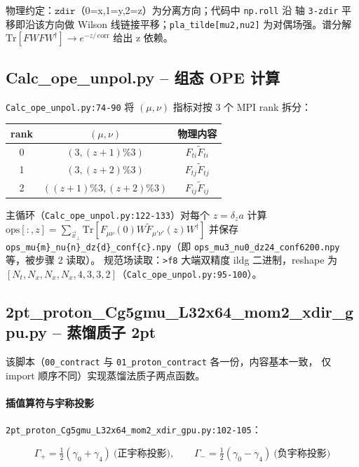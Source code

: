 \documentclass[UTF8]{ctexart}
\begin{document}
物理约定：$\texttt{zdir}$（0=x,1=y,2=z）为分离方向；代码中 \texttt{np.roll} 沿
轴 \texttt{3-zdir} 平移即沿该方向做 Wilson 线链接平移；\texttt{pla\_tilde[mu2,nu2]}
为对偶场强。谱分解 $\mathrm{Tr}[FWFW^\dagger]\to e^{-z/\,\text{corr}}$ 给出 z 依赖。

\subsection{Calc\_ope\_unpol.py -- 组态 OPE 计算}

\texttt{Calc\_ope\_unpol.py:74-90} 将 $(\mu,\nu)$ 指标对按 3 个 MPI rank 拆分：

\begin{center}
\begin{tabular}{ccc}
\toprule
rank & $(\mu,\nu)$ & 物理内容 \\
\midrule
0 & $(3,(z+1)\%3)$ & $F_{t i} \tilde F_{t i}$ \\
1 & $(3,(z+2)\%3)$ & $F_{t j} \tilde F_{t j}$ \\
2 & $((z+1)\%3,(z+2)\%3)$ & $F_{i j} \tilde F_{i j}$ \\
\bottomrule
\end{tabular}
\end{center}

主循环（\texttt{Calc\_ope\_unpol.py:122-133}）对每个 $z=\delta_z a$ 计算
$\mathrm{ops}[:,z]=\sum_{\vec x_\perp}\mathrm{Tr}[F_{\mu\nu}(0)W\tilde F_{\mu'\nu'}(z)W^\dagger]$
并保存 \texttt{ops\_mu\{m\}\_nu\{n\}\_dz\{d\}\_conf\{c\}.npy}（即
\texttt{ops\_mu3\_nu0\_dz24\_conf6200.npy} 等，被步骤 2 读取）。
规范场读取：\texttt{>f8} 大端双精度 ildg 二进制，reshape 为
$[N_t,N_x,N_x,N_x,4,3,3,2]$（\texttt{Calc\_ope\_unpol.py:95-100}）。

\subsection{2pt\_proton\_Cg5gmu\_L32x64\_mom2\_xdir\_gpu.py -- 蒸馏质子 2pt}

该脚本（\texttt{00\_contract} 与 \texttt{01\_proton\_contract} 各一份，内容基本一致，
仅 import 顺序不同）实现蒸馏法质子两点函数。

\paragraph{插值算符与宇称投影}
\texttt{2pt\_proton\_Cg5gmu\_L32x64\_mom2\_xdir\_gpu.py:102-105}：

\begin{equation}
  \Gamma_+ = \tfrac12(\gamma_0+\gamma_4)\ \text{(正宇称投影)},\qquad
  \Gamma_- = \tfrac12(\gamma_0-\gamma_4)\ \text{(负宇称投影)}
\end{equation}
\end{document}
